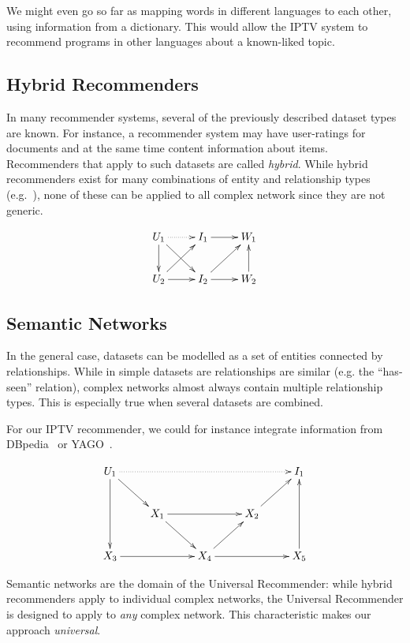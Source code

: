 \documentclass{article}
\begin{document}
We might even go so far as mapping words in different languages to each
other, using information from a dictionary.  This would allow the
IPTV system to recommend programs in other languages about a
known-liked topic. 

\subsection{Hybrid Recommenders}
In many recommender systems, several of the previously described dataset
types are known.  For instance, a recommender system may have
user-ratings for documents and at the same time content information
about items.  Recommenders that apply to such datasets are called
\emph{hybrid}.  While hybrid recommenders exist for many combinations of
entity and relationship types (e.g.~\cite{b335,b30,b379,b426}), none of these can
be applied to all complex network since they are not generic.  

\begin{displaymath}
  \xymatrix{
    U_1 \ar@{.>}[r] \ar[rd] \ar[d] & I_1 \ar[r] & W_1 \\
    U_2 \ar[ru] \ar[r] & I_2 \ar[ru] \ar[r] & W_2 \ar[u] 
  }
\end{displaymath}

\subsection{Semantic Networks}
In the general case, datasets can be modelled as a set of entities
connected by relationships.  While in simple datasets are relationships
are similar (e.g. the ``has-seen'' relation), complex networks almost
always contain multiple relationship types.  This is especially true
when several datasets are combined.  

For our IPTV recommender, we could for instance integrate
information from DBpedia~\cite{b332} or YAGO~\cite{b333}. 

\begin{displaymath}
  \xymatrix{
    U_1 \ar@{.>}[rrrr] \ar[rd] \ar[dd] & & & & I_1 \\
    & X_1 \ar[rr] \ar[rd] & & X_2 \ar[ru]  \\
    X_3 \ar[rr] & & X_4 \ar[ru] \ar[rr] & & X_5 \ar[uu] 
  }
\end{displaymath}

Semantic networks are the domain of the Universal Recommender:  while
hybrid recommenders apply to individual complex networks, the Universal
Recommender is designed to apply to \emph{any} complex network.  This
characteristic makes our approach \emph{universal}.  
\end{document}
